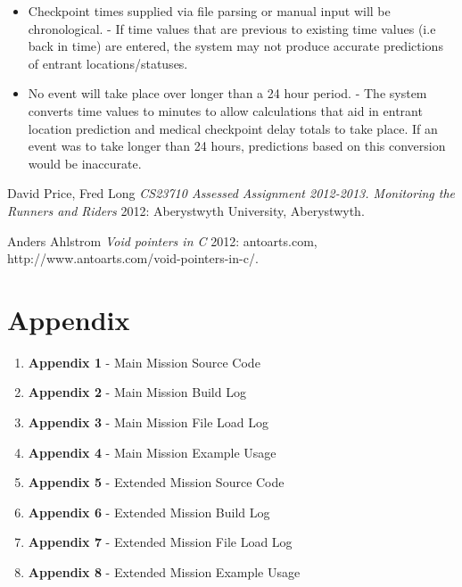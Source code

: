 \documentclass{article}
\begin{document}
\begin{itemize}

\item Checkpoint times supplied via file parsing or manual input will be chronological. - If time values that are previous to existing time values (i.e back in time) are entered, the system may not produce accurate predictions of entrant locations/statuses.

\item No event will take place over longer than a 24 hour period. - The system converts time values to minutes to allow calculations that aid in entrant location prediction and medical checkpoint delay totals to take place. If an event was to take longer than 24 hours, predictions based on this conversion would be inaccurate.

\end{itemize}

\clearpage 



  \begin{thebibliography}{1}

   David Price, Fred Long {\em CS23710 Assessed Assignment 2012-2013. Monitoring the Runners and Riders}  2012: Aberystwyth University, Aberystwyth.

    Anders Ahlstrom {\em Void pointers in C}  2012: antoarts.com, http://www.antoarts.com/void-pointers-in-c/.

  \end{thebibliography}
  
\section*{Appendix}

\begin{enumerate}
  \item \textbf{Appendix 1} - Main Mission Source Code
  \item \textbf{Appendix 2} - Main Mission Build Log
  \item \textbf{Appendix 3} - Main Mission File Load Log
  \item \textbf{Appendix 4} - Main Mission Example Usage
  \item \textbf{Appendix 5} - Extended Mission Source Code
  \item \textbf{Appendix 6} - Extended Mission Build Log
  \item \textbf{Appendix 7} - Extended Mission File Load Log
  \item \textbf{Appendix 8} - Extended Mission Example Usage
\end{enumerate}
\end{document}
